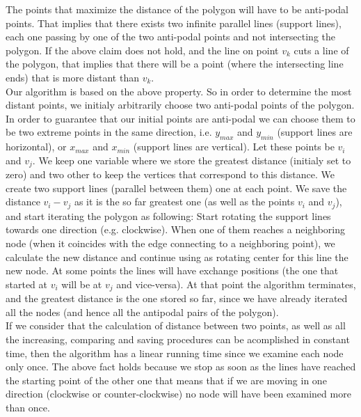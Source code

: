 The points that maximize the distance of the polygon will have to be anti-podal points. That implies that there exists two infinite parallel lines (support lines), each one passing by one of the two anti-podal points and not intersecting the polygon. If the above claim does not hold, and the line on point $v_k$ cuts a line of the polygon, that implies that there will be a point (where the intersecting line ends) that is more distant than $v_k$.\\
Our algorithm is based on the above property. So in order to determine the most distant points, we initialy arbitrarily choose two anti-podal points of the polygon. In order to guarantee that our initial points are anti-podal we can choose them to be two extreme points in the same direction, i.e. $y_{max}$ and $y_{min}$ (support lines are horizontal), or $x_{max}$ and $x_{min}$ (support lines are vertical). Let these points be $v_i$ and $v_j$. We keep one variable where we store the greatest distance (initialy set to zero) and two other to keep the vertices that correspond to this distance.  We create two support lines (parallel between them) one at each point. We save the distance $v_i-v_j$ as it is the so far greatest one (as well as the points $v_i$ and $v_j$), and start iterating the polygon as following:  Start rotating the support lines towards one direction (e.g. clockwise). When one of them reaches a neighboring node (when it coincides with the edge connecting to a neighboring point), we calculate the new distance and continue using as rotating center for this line the new node. At some points the lines will have exchange positions (the one that started at $v_i$ will be at $v_j$ and vice-versa). At that point the algorithm terminates, and the greatest distance is the one stored so far, since we have already iterated all the nodes (and hence all the antipodal pairs of the polygon).\\
If we consider that the calculation of distance between two points, as well as all the increasing, comparing and saving procedures can be acomplished in constant time, then the algorithm has a linear running time since we examine each node only once. The above fact holds because we stop as soon as the lines have reached the starting point of the other one that means that if we are moving in one direction (clockwise or counter-clockwise) no node will have been examined more than once. 

